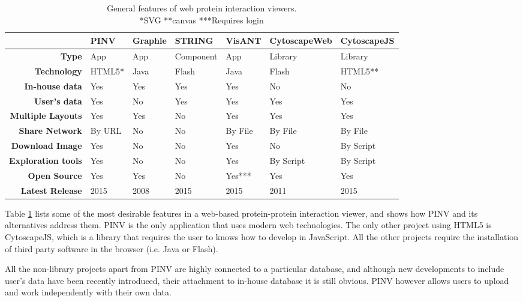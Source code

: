 \begin{table}[!ht]
\centering
        \caption{General features of web protein interaction viewers. \\ *SVG **canvas ***Requires login}
        \begin{tabular}{ r | l | l | l | l | l | l }
 \rowcolor{table_header}
 & \textbf{PINV} & \textbf{Graphle} & \textbf{STRING} & \textbf{VisANT} & \textbf{CytoscapeWeb} & \textbf{CytoscapeJS}\\
\hline \rowcolor{row_odd}
\textbf{Type} & App & App & Component & App & Library & Library\\
\rowcolor{row_even}
\textbf{Technology} & HTML5* & Java & Flash & Java & Flash & HTML5**\\
\rowcolor{row_odd}
\textbf{In-house data} & Yes & Yes & Yes & Yes & No & No\\
\rowcolor{row_even}
\textbf{User's data} & Yes & No & Yes & Yes & Yes & Yes\\
\rowcolor{row_odd}
\textbf{Multiple Layouts} & Yes & Yes & No & Yes & Yes & Yes\\
\rowcolor{row_even}
\textbf{Share Network} & By URL & No & No & By File & By File & By File\\
\rowcolor{row_odd}
\textbf{Download Image} & Yes & No & No & Yes & No & By Script\\
\rowcolor{row_even}
\textbf{Exploration tools} & Yes & No & No & Yes & By Script & By Script\\
\rowcolor{row_odd}
\textbf{Open Source} & Yes & Yes & No & Yes*** & Yes & Yes\\
\rowcolor{row_even}
\textbf{Latest Release} & 2015 & 2008 & 2015 & 2015 & 2011 & 2015\\ 
        \end{tabular}
        \label{tab:int_viewers}
\end{table}

Table \ref{tab:int_viewers} lists some of the most desirable features in a web-based protein-protein interaction viewer, and shows how PINV and its alternatives address them. PINV is the only application that uses modern web technologies. The only other project using HTML5 is CytoscapeJS, which is a library that requires the user to knows how to develop in JavaScript. All the other projects require the installation of third party software in the browser (i.e. Java or Flash).

All the non-library projects apart from PINV are highly connected to a particular database, and although new developments to include user's data have been recently introduced, their attachment to in-house database it is still obvious. PINV however allows users to upload and work independently with their own data.

